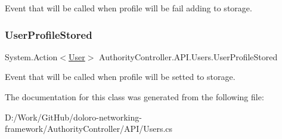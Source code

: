 Event that will be called when profile will be fail adding to storage. 

\mbox{\label{class_authority_controller_1_1_a_p_i_1_1_users_a38d89296f7a63c029fe5873e12451ce3}} 
\subsubsection{\texorpdfstring{User\+Profile\+Stored}{UserProfileStored}}
{\footnotesize\ttfamily System.\+Action$<$\mbox{\hyperlink{class_authority_controller_1_1_data_1_1_user}{User}}$>$ Authority\+Controller.\+A\+P\+I.\+Users.\+User\+Profile\+Stored\hspace{0.3cm}{\ttfamily [static]}}



Event that will be called when profile will be setted to storage. 



The documentation for this class was generated from the following file\+:\begin{DoxyCompactItemize}
\item 
D\+:/\+Work/\+Git\+Hub/doloro-\/networking-\/framework/\+Authority\+Controller/\+A\+P\+I/Users.\+cs\end{DoxyCompactItemize}
